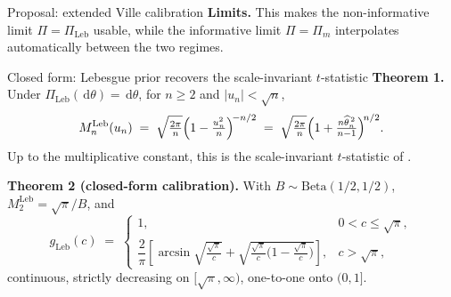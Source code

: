 \documentclass[final]{beamer}
\newcommand{\dd}{\,\mathrm{d}}
\newcommand{\Leb}{\mathrm{Leb}}
\newcommand{\thetahat}{\widehat{\theta}_n}
\newlength{\colwidth}
\begin{document}
\begin{frame}[t]
\begin{columns}[t]
\begin{column}{\colwidth}
\begin{alertblock}{Proposal: extended Ville calibration}
  \vspace{0.08cm} 
  \textbf{Limits.} This makes the non-informative limit $\Pi=\Pi_{\Leb}$ usable, while the informative limit $\Pi=\Pi_m$ interpolates automatically between the two regimes. 
\end{alertblock}

\begin{block}{Closed form: Lebesgue prior recovers the scale-invariant \texorpdfstring{$t$}{t}-statistic}
    \textbf{Theorem 1.} Under $\Pi_{\Leb}(\dd\theta)=\dd\theta$, for $n\ge 2$ and $|u_n|<\sqrt n$,
    {\large
    \[
      M_n^{\Leb}(u_n) \;=\; \sqrt{\tfrac{2\pi}{n}}\Bigl(1-\tfrac{u_n^{2}}{n}\Bigr)^{\!-n/2} \;=\; \sqrt{\tfrac{2\pi}{n}}\Bigl(1+\tfrac{n\thetahat^{\,2}}{n-1}\Bigr)^{\!n/2}.
    \]}
    Up to the multiplicative constant, this is the scale-invariant $t$-statistic of \cite{Lai1976}.
    
    \vspace{0.1cm}
    \textbf{Theorem 2 (closed-form calibration).} With $B\sim\mathrm{Beta}(1/2,1/2)$, $M_2^{\Leb}=\sqrt\pi/B$, and
    \[
      g_{\Leb}(c) \;=\; \begin{cases}
        1, & 0<c\le\sqrt\pi,\\[2pt]
        \dfrac{2}{\pi}\!\left[\arcsin\!\sqrt{\tfrac{\sqrt\pi}{c}}+\sqrt{\tfrac{\sqrt\pi}{c}\bigl(1-\tfrac{\sqrt\pi}{c}\bigr)}\right], & c>\sqrt\pi,
      \end{cases}
    \]
    continuous, strictly decreasing on $[\sqrt\pi,\infty)$, one-to-one onto $(0,1]$.
  \end{block}







\end{column}
\end{columns}
\end{frame}
\end{document}
